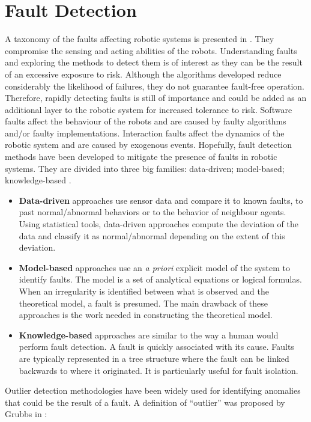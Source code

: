 \section{Fault Detection}
\label{sec:faultdetection}
A taxonomy of the faults affecting robotic systems is presented in \cite{khalastchi2018fault}. They compromise the sensing and acting abilities of the robots. Understanding faults and exploring the methods to detect them is of interest as they can be the result of an excessive exposure to risk. Although the algorithms developed reduce considerably the likelihood of failures, they do not guarantee fault-free operation. Therefore, rapidly detecting faults is still of importance and could be added as an additional layer to the robotic system for increased tolerance to risk. Software faults affect the behaviour of the robots and are caused by faulty algorithms and/or faulty implementations. Interaction faults affect the dynamics of the robotic system and are caused by exogenous events. Hopefully, fault detection methods have been developed to mitigate the presence of faults in robotic systems. They are divided into three big families: data-driven; model-based; knowledge-based \cite{khalastchi2018fault}. 

\begin{itemize}
\item \textbf{Data-driven} approaches use sensor data and compare it to known faults, to past normal/abnormal behaviors or to the behavior of neighbour agents. Using statistical tools, data-driven approaches compute the deviation of the data and classify it as normal/abnormal depending on the extent of this deviation.
\item \textbf{Model-based} approaches use an \textit{a priori} explicit model of the system to identify faults. The model is a set of analytical equations or logical formulas. When an irregularity is identified between what is observed and the theoretical model, a fault is presumed. The main drawback of these approaches is the work needed in constructing the theoretical model. 
\item \textbf{Knowledge-based} approaches are similar to the way a human would perform fault detection. A fault is quickly associated with its cause. Faults are typically represented in a tree structure where the fault can be linked backwards to where it originated. It is particularly useful for fault isolation.
\end{itemize}

Outlier detection methodologies have been widely used for identifying anomalies that could be the result of a fault. A definition of “outlier” was proposed by Grubbs in \cite{hodge2004survey}: 

